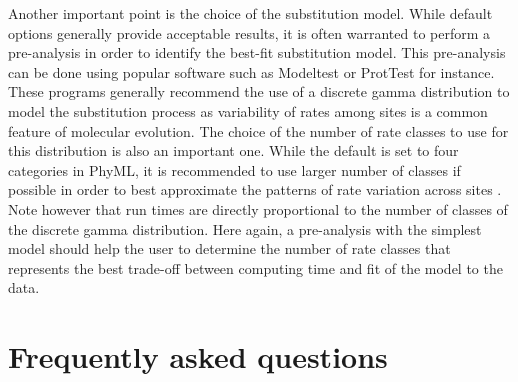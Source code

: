 \documentclass[a4paper,12pt]{article}
\begin{document}
Another important  point is the  choice of the  substitution model. While default  options generally
provide acceptable results, it is often warranted to perform a pre-analysis in order to identify the
best-fit substitution model.  This pre-analysis can be done using popular software such as Modeltest
\cite{posada98} or ProtTest  \cite{abascal05} for instance.  These programs  generally recommend the
use of a discrete gamma distribution to model the substitution process as variability of rates among
sites is a common  feature of molecular evolution.  The choice of the number  of rate classes to use
for this  distribution is  also an important  one. While the  default is  set to four  categories in
PhyML, it is  recommended to use larger number  of classes if possible in order  to best approximate
the  patterns of rate  variation across  sites \cite{galtier04}.   Note however  that run  times are
directly proportional to  the number of classes  of the discrete gamma distribution.   Here again, a
pre-analysis with the  simplest model should help the  user to determine the number  of rate classes
that represents the best trade-off between computing time and fit of the model to the data.


\section{Frequently asked questions}  
\end{document}
